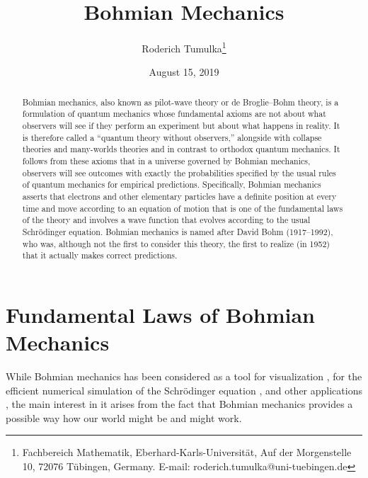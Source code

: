 \documentclass[12pt]{article}
\title{Bohmian Mechanics}
\author{
Roderich Tumulka\footnote{Fachbereich Mathematik, Eberhard-Karls-Universit\"at,
	Auf der Morgenstelle 10, 72076 T\"ubingen, Germany. E-mail: roderich.tumulka@uni-tuebingen.de}
}
\date{August 15, 2019}
\begin{document}
\maketitle
\begin{abstract}
Bohmian mechanics, also known as pilot-wave theory or de Broglie--Bohm theory, is a formulation of quantum mechanics whose fundamental axioms are not about what observers will see if they perform an experiment but about what happens in reality. It is therefore called a ``quantum theory without observers,'' alongside with collapse theories \cite{Bell87,Lew} and many-worlds theories \cite{Sau,AGTZ11} and in contrast to orthodox quantum mechanics. It follows from these axioms that in a universe governed by Bohmian mechanics, observers will see outcomes with exactly the probabilities specified by the usual rules of quantum mechanics for empirical predictions. Specifically, Bohmian mechanics asserts that electrons and other elementary particles have a definite position at every time and move according to an equation of motion that is one of the fundamental laws of the theory and involves a wave function that evolves according to the usual Schr\"odinger equation. Bohmian mechanics is named after David Bohm (1917--1992), who was, although not the first to consider this theory, the first to realize (in 1952) that it actually makes correct predictions.
\end{abstract}

\newpage


\section{Fundamental Laws of Bohmian Mechanics}

While Bohmian mechanics has been considered as a tool for visualization \cite{philippidis79}, for the efficient numerical simulation of the Schr\"odinger equation \cite{Chat}, and other applications \cite{Ori}, the main interest in it arises from the fact that Bohmian mechanics provides a possible way how our world might be and might work.
\end{document}
